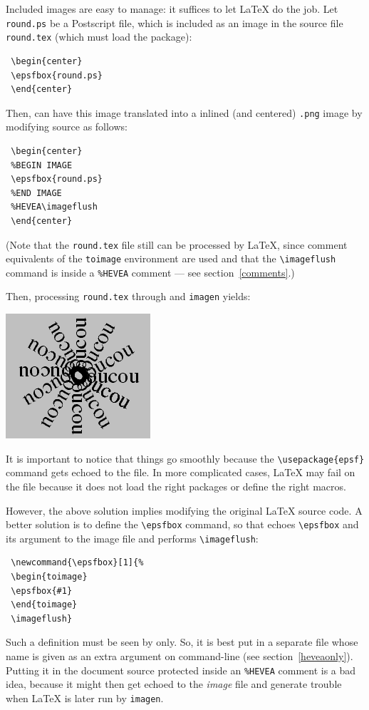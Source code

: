 Included images are easy to manage: it suffices to let \LaTeX{} do the
job.
Let \texttt{round.ps} be a Postscript file, which is included as an
image in the source file \texttt{round.tex} (which must load the
 package):
\begin{verbatim}
 \begin{center}
 \epsfbox{round.ps}
 \end{center}
\end{verbatim}
Then, \hevea{} can have this image translated into a inlined (and
centered) \texttt{.png} image by modifying source as follows:
\begin{verbatim}
 \begin{center}
 %BEGIN IMAGE
 \epsfbox{round.ps}
 %END IMAGE
 %HEVEA\imageflush
 \end{center}
\end{verbatim}
(Note that the \texttt{round.tex} file
still can be processed by \LaTeX, since comment equivalents
of the \texttt{toimage} environment are used and that
the \verb+\imageflush+ command is  inside
a \verb+%HEVEA+ comment --- see section~\ref{comments}.)

Then, processing \texttt{round.tex} through \hevea{} and
\texttt{imagen} yields:
\begin{htmlout}
\begin{center}
\includegraphics{round}%
\end{center}
\end{htmlout}
It is important to notice that things go smoothly because the
\verb+\usepackage{epsf}+ command  gets echoed to the
 file.  In more complicated cases, \LaTeX{} may fail
on the  file because it does not load the right
packages or define the right macros.


However, the above solution implies modifying the original \LaTeX{}
source code.
A better solution is to define the \verb+\epsfbox+
command, so that \hevea{} echoes  \verb+\epsfbox+ and its argument to
the image file and performs \verb+\imageflush+:
\begin{verbatim}
 \newcommand{\epsfbox}[1]{%
 \begin{toimage}
 \epsfbox{#1}
 \end{toimage}
 \imageflush}
\end{verbatim}
Such a definition must be seen by \hevea{} only. So, it is best put
in a separate file whose name is given as an extra argument on
\hevea{} command-line (see section~\ref{heveaonly}).
Putting it in the document source
protected inside an \verb+%HEVEA+ comment is a bad idea, %
because it might then get echoed to the \textit{image} file
and generate trouble when \LaTeX{} is later run by \texttt{imagen}.

